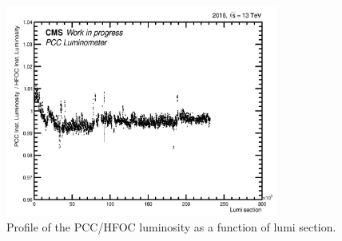 \begin{itemize}
\begin{figure}[!htp]
\centering
\includegraphics[width=0.8\textwidth]{ashish_thesis/PCC_HFOCvsls_ProfileX_all_1.png}
\caption[Luminosity ratio profile]{Profile of the PCC/HFOC luminosity as a function of lumi section.}
\label{fig:stabprof_7098}
\end{figure}



\end{itemize}
